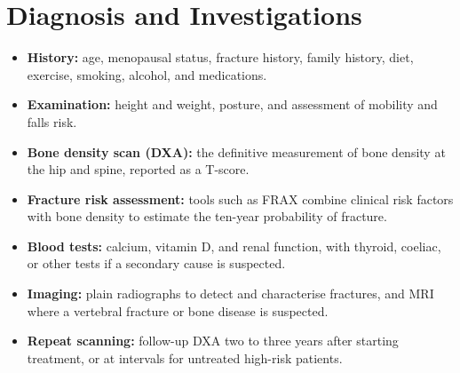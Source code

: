 \section*{Diagnosis and Investigations}
\begin{itemize}
    \item \textbf{History:} age, menopausal status, fracture history, family history, diet, exercise, smoking, alcohol, and medications.
    \item \textbf{Examination:} height and weight, posture, and assessment of mobility and falls risk.
    \item \textbf{Bone density scan (DXA):} the definitive measurement of bone density at the hip and spine, reported as a T-score.
    \item \textbf{Fracture risk assessment:} tools such as FRAX combine clinical risk factors with bone density to estimate the ten-year probability of fracture.
    \item \textbf{Blood tests:} calcium, vitamin D, and renal function, with thyroid, coeliac, or other tests if a secondary cause is suspected.
    \item \textbf{Imaging:} plain radiographs to detect and characterise fractures, and MRI where a vertebral fracture or bone disease is suspected.
    \item \textbf{Repeat scanning:} follow-up DXA two to three years after starting treatment, or at intervals for untreated high-risk patients.
\end{itemize}

